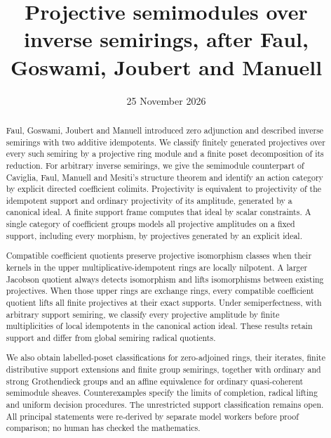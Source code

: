 \documentclass[11pt]{amsart}
\title[Projectives over inverse semirings]{Projective semimodules over inverse semirings, after Faul, Goswami, Joubert and Manuell}
\author{}
\date{25 November 2026}
\theoremstyle{definition}
\theoremstyle{remark}
\begin{document}
\begin{abstract}
Faul, Goswami, Joubert and Manuell introduced zero adjunction and described inverse semirings with two additive idempotents. We classify finitely generated projectives over every such semiring by a projective ring module and a finite poset decomposition of its reduction. For arbitrary inverse semirings, we give the semimodule counterpart of Caviglia, Faul, Manuell and Mesiti's structure theorem and identify an action category by explicit directed coefficient colimits. Projectivity is equivalent to projectivity of the idempotent support and ordinary projectivity of its amplitude, generated by a canonical ideal. A finite support frame computes that ideal by scalar constraints. A single category of coefficient groups models all projective amplitudes on a fixed support, including every morphism, by projectives generated by an explicit ideal.

Compatible coefficient quotients preserve projective isomorphism classes when their kernels in the upper multiplicative-idempotent rings are locally nilpotent. A larger Jacobson quotient always detects isomorphism and lifts isomorphisms between existing projectives. When those upper rings are exchange rings, every compatible coefficient quotient lifts all finite projectives at their exact supports. Under semiperfectness, with arbitrary support semiring, we classify every projective amplitude by finite multiplicities of local idempotents in the canonical action ideal. These results retain support and differ from global semiring radical quotients.

We also obtain labelled-poset classifications for zero-adjoined rings, their iterates, finite distributive support extensions and finite group semirings, together with ordinary and strong Grothendieck groups and an affine equivalence for ordinary quasi-coherent semimodule sheaves. Counterexamples specify the limits of completion, radical lifting and uniform decision procedures. The unrestricted support classification remains open. All principal statements were re-derived by separate model workers before proof comparison; no human has checked the mathematics.
\end{abstract}
\maketitle
\end{document}
